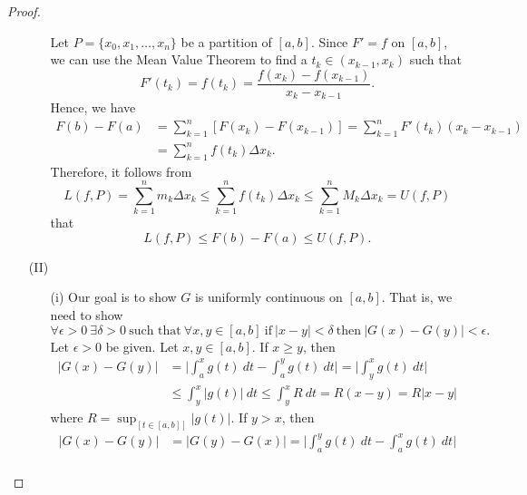 \begin{proof}
\begin{enumerate}
\begin{enumerate}
                   Let \( P = \{ {x}_{0}, {x}_{1}, \dots, {x}_{n} \}  \) be a partition of \( [a,b] \). Since \( F' = f  \) on \( [a,b] \), we can use the Mean Value Theorem to find a \( {t}_{k } \in ({x}_{k-1},{x}_{k}) \) such that 
                   \[  F'({t}_{k}) = f({t}_{k}) = \frac{ f({x}_{k}) - f({x}_{k-1}) }{ {x}_{k} - {x}_{k-1} }.  \]
                   Hence, we have 
                   \begin{align*}
                       F(b) - F(a) &= \sum_{ k=1  }^{ n } [F({x}_{k}) - F({x}_{k-1})] = \sum_{ k=1  }^{ n } F'({t}_{k}) ({x}_{k} - {x}_{k-1}) \\
                                   &= \sum_{ k=1 }^{ n } f({t}_{k}) \Delta {x}_{k}.
                   \end{align*}
                   Therefore, it follows from
                   \[  L(f,P) = \sum_{ k=1  }^{ n } {m}_{k } \Delta {x}_{k} \leq \sum_{ k=1  }^{ n } f({t}_{k}) \Delta {x}_{k} \leq \sum_{ k=1  }^{ n } {M}_{k} \Delta {x}_{k } = U(f,P) \]
                   that 
                   \[  L(f,P) \leq F(b) - F(a) \leq U(f,P). \]
            \end{enumerate}
        \item[(II)] 
            \begin{enumerate}
                \item[(i)] Our goal is to show \( G  \) is uniformly continuous on \( [a,b] \). That is, we need to show 
                    \[  \forall \epsilon > 0 \ \exists \delta > 0 \ \text{such that} \ \forall x,y \in [a,b] \ \text{if} \ | x - y |  < \delta \ \text{then} \ | G(x) - G(y) |  < \epsilon.  \]
                    Let \( \epsilon > 0  \) be given. Let \( x,y \in [a,b] \). If \( x \geq y  \), then 
                    \begin{align*}
                        | G(x) - G(y) | &= \Big| \int_{ a }^{ x }  g(t) \ dt - \int_{ a }^{ y }  g(t) \ dt  \Big| = \Big| \int_{ y }^{ x }  g(t) \ dt  \Big|  \\
                                        &\leq \int_{ y }^{ x }  | g(t) |   \ dt \leq \int_{ y }^{ x }  R  \ dt = R(x-y) = R | x - y |
                    \end{align*}
                    where \( R = \sup_[t \in [a,b]] | g(t) |  \). If \( y > x  \), then
                    \begin{align*}
                        | G(x) - G(y)  | &= | G(y) - G(x) | =  \Big| \int_{ a }^{ y }  g(t) \ dt - \int_{ a }^{ x }  g(t) \ dt  \Big|  \\

\end{align*}
\end{enumerate}
\end{enumerate}
\end{proof}
